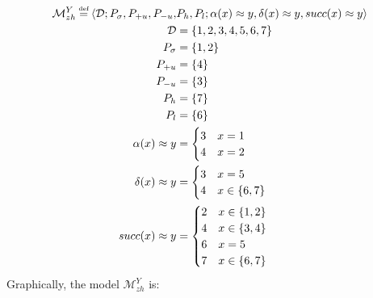 \documentclass{article}
\newcommand\myeq{\mathrel{\stackrel{\makebox[0pt]{\mbox{\normalfont\tiny def}}}{=}}}
\newcommand{\ap}{\approx}
\begin{document}
\begin{equation}
\begin{aligned}
\mathcal{M}^{Y}_{zh} \myeq \langle \mathcal{D}; P_{\sigma}, P_{+u}, P_{-u}, &P_{h}, P_{l}; \alpha(x)\ap y, \delta(x)\ap y, succ(x)\ap y \rangle \\
\mathcal{D} &= \{1, 2, 3, 4, 5, 6, 7\} \\
P_{\sigma} &= \{1, 2\} \\
P_{+u} &= \{4\} \\
P_{-u} &= \{3\} \\
P_{h} &= \{7\} \\
P_{l} &= \{6\} \\
\alpha(x)\ap y &= \begin{cases} 3 & x=1 \\ 4 & x=2 \end{cases} \\
\delta(x)\ap y &= \begin{cases} 3 & x=5 \\ 4 & x\in \{6,7\} \end{cases} \\
succ(x)\ap y &= \begin{cases} 2 & x\in \{1,2\} \\ 4 & x\in \{3,4\} \\ 6 & x=5 \\ 7 & x\in\{6,7\} \end{cases} \\
\end{aligned}
\end{equation}
Graphically, the model $\mathcal{M}^{Y}_{zh}$ is:
\end{document}

